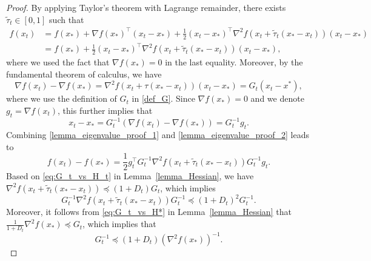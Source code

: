 \documentclass[11pt,letterpaper]{article}
\newcommand\0{{\Vector{0}}}
\newcommand\1{{\Vector{1}}}
\numberwithin{assumption}{section}
\numberwithin{definition}{section}
\numberwithin{theorem}{section}
\numberwithin{remark}{section}
\begin{document}
\begin{proof}    
    By applying Taylor's theorem with Lagrange remainder, there exists $\tilde{\tau}_t \in [0,1]$ such that 
    \begin{equation}\label{lemma_eigenvalue_proof_1}
        \begin{split}
            f(x_t) & = f(x_*) + \nabla{f(x_*)}^\top (x_t - x_*) + \frac{1}{2}(x_t - x_*)^\top \nabla^2{f(x_t + \tilde{\tau}_t(x_* - x_t))}(x_t - x_*) \\
            & = f(x_*) + \frac{1}{2}(x_t - x_*)^\top \nabla^2{f(x_t + \tilde{\tau}_t(x_* - x_t))}(x_t - x_*),
    \end{split}
    \end{equation}
    where we used the fact that $\nabla{f(x_*)} = 0$ in the last equality. Moreover, by the fundamental theorem of calculus, we have
    \begin{equation*}
        \nabla{f(x_t)} - \nabla{f(x_*)} = \nabla^2{f(x_t + \tau (x_{*} - x_t))} (x_t - x_*) = G_t(x_t - x^*),
    \end{equation*}
    where we use the definition of $G_t$ in \eqref{def_G}. Since $\nabla f(x_*) = 0$ and we denote $g_t = \nabla{f(x_t)}$, this further implies that
    \begin{equation}\label{lemma_eigenvalue_proof_2}
        x_t - x_* = G_t^{-1}(\nabla{f(x_t)} - \nabla{f(x_*)}) = G_t^{-1} g_t.
    \end{equation}
    Combining \eqref{lemma_eigenvalue_proof_1} and \eqref{lemma_eigenvalue_proof_2} leads to 
    \begin{equation}\label{eq:f_x_k-f_*}
        f(x_t) - f(x_*) = \frac{1}{2}g_t^\top G_t^{-1}\nabla^2{f(x_t + \tilde{\tau}_t(x_* - x_t))}G_t^{-1}g_t. 
    \end{equation}
    Based on \eqref{eq:G_t_vs_H_t} in Lemma~\ref{lemma_Hessian}, we have $\nabla^2{f(x_t + \tilde{\tau}_t (x_{*} - x_{t}))} \preceq (1 + D_t)G_t$, which implies
    \begin{equation}\label{lemma_eigenvalue_proof_3}
        G_t^{-1}\nabla^2{f(x_t + \tilde{\tau}_t (x_{*} - x_{t}))}G_t^{-1} \preceq (1 + D_t)^2G_t^{-1}.
    \end{equation}
    Moreover, it follows from \eqref{eq:G_t_vs_H*} in Lemma~\ref{lemma_Hessian} that $\frac{1}{1 + D_t} \nabla^2{f(x_*)} \preceq G_t$, which implies that
    \begin{equation}\label{lemma_eigenvalue_proof_4}
        G_t^{-1} \preceq (1 + D_t)(\nabla^2{f(x_*)})^{-1}.
    \end{equation}

\end{proof}
\end{document}
